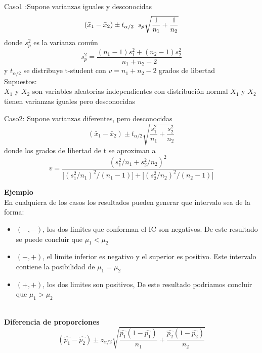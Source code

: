 \documentclass[base=hide,12pt]{elegantbook}
\begin{document}
			Caso1 :Supone varianzas iguales y desconocidas\\
			$$(\bar{x}_{1}-\bar{x}_{2})\pm t_{\alpha/2} \hspace{.2cm}s_{p} \sqrt{\frac{1}{n_{1}}+\frac{1}{n_{2}}} $$
			donde $s_{p}^{2}$ es la varianza común
			$$s_{p}^{2}=\frac{(n_{1}-1)s_{1}^{2}+(n_{2}-1)s_{2}^{2}}{n_{1}+n_{2}-2}$$
			y $t_{\alpha/2}$ se distribuye t-student con $v=n_{1}+n_{2}-2$ grados de libertad\\
			Supuestos: \\
			$X_{1}$ y $X_{2}$ son variables aleatorias independientes con distribución normal
			$X_{1}$ y $X_{2}$ tienen varianzas iguales pero desconocidas

	
	

			Caso2: Supone varianzas diferentes, pero desconocidas \\
			$$(\bar{x}_{1}-\bar{x}_{2})\pm t_{\alpha/2} \sqrt{\frac{s_{1}^{2}}{n_{1}}+\frac{s_{2}^{2}}{n_{2}}} $$
			donde los grados de libertad de t se aproximan a
			$$v=\frac{(s_{1}^{2}/n_{1}+s_{2}^{2}/n_{2})^{2}}{\Big[(s_{1}^{2}/n_{1})^{2}/(n_{1}-1)\Big]+\Big[(s_{2}^{2}/n_{2})^{2}/(n_{2}-1)\Big]}$$

	
\textcolor{col1}{\bf Ejemplo}\\	
	
	
	En cualquiera de los casos los resultados pueden generar que intervalo sea de la forma:
\begin{itemize}	
	\item $(-,-)$, los dos limites que conforman el IC son negativos. De este resultado se puede concluir que $\mu_{1}<\mu_{2}$
	\item $(-,+)$, el limite inferior es negativo y el superior es positivo. Este intervalo contiene la posibilidad de $\mu_{1}=\mu_{2}$
	\item $(+,+)$, los dos limites son positivos, De este resultado podriamos concluir que $\mu_{1}>\mu_{2}$ \\ \\
\end{itemize}	
\textcolor{col4}{\bf \large Diferencia de proporciones}\\
	

			$$(\widehat{p_{1}}-\widehat{p_{2}}) \pm z_{\alpha/2} \sqrt{\frac{\widehat{p_{1}}(1-\widehat{p_{1}})}{n_{1}}+\frac{\widehat{p_{2}}(1-\widehat{p_{2}})}{n_{2}}}$$
\end{document}
